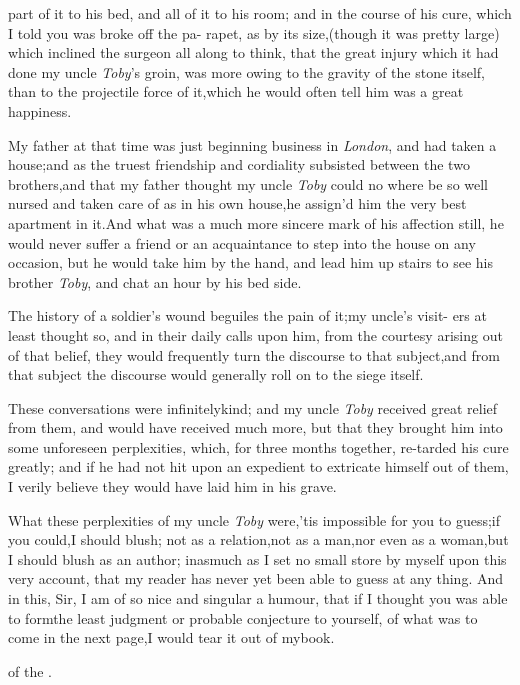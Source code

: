 \documentclass{article}
\begin{document}
\noindent
{}
part of it to his bed, and all of it to his 
room; and in the course of his cure,\break
{}
which I told you was broke off the pa-
rapet,\tsk
as by its size,\tsk  (though it was pretty large) which inclined
the surgeon all along to think, that the great injury which it
had done my uncle \textit{Toby}’s groin, was more owing to the
gravity of the stone itself, than to the projectile force of
it,\tsk  which he would often tell him was a great happiness.

My father at that time was just beginning business in
\textit{London}, and had taken a house;\tsk  and as the truest
friendship and cordiality subsisted between the two
brothers,\tsk  and that my father thought my uncle \textit{Toby} could no where be so well nursed
and taken care of as in his own house,\tsh  he
assign’d him the very best apartment in it.\tsk  And what
was a much more sincere mark of his affection still, he would never
suffer a friend or an acquaintance to step into the house on
any
occasion, but he would take him by the hand, and lead him up stairs
to see his brother \textit{Toby}, and chat an hour by his
bed side.

The history of a soldier’s wound beguiles the pain of
it;\tsk  my uncle’s visit-\break
ers at least thought so, and in their daily\break
calls upon him, from the courtesy arising\break
out of that belief, they would frequently\break
turn the discourse to that subject,\tsk  and\break
from that subject the discourse would\break
generally roll on to the siege itself.

These conversations were infinitely\break kind; and my uncle
\textit{Toby} received great relief from them, and would have
recei\-ved much more, but that they brought him into some unforeseen
perplexities, which, for three months together, re-\break tarded his
cure greatly; and if he had not hit upon an
expedient to extricate himself out of them, I verily believe they
would have laid him in his grave.

What these perplexities of my uncle \textit{Toby}
were,\tsh  ’tis impossible for you to guess;\tsk  if
you could,\tsk  I should blush; not as a relation,\tsk  not as a
man,\tsk  nor even as a woman,\tsk  but I should blush as an
author; inasmuch as I set no small store by myself upon this very
account, that my reader has never yet been able to guess at any
thing. And in this, Sir, I am of so nice and singular a humour,
that if I thought you was able to form\break the least judgment or
probable conjecture to yourself, of what was to come in the next
page,\tsk  I would tear it out of my\break book.

\bigskip
\centerline{\kern 4pt of the .}
\newpage\pagestyle{empty}\null
\end{document}
